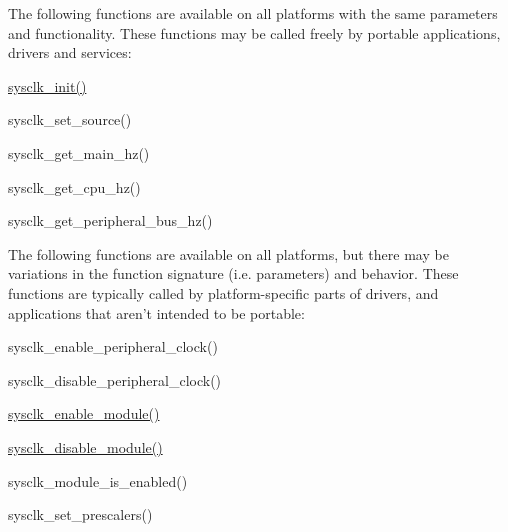 The following functions are available on all platforms with the same parameters and functionality. These functions may be called freely by portable applications, drivers and services\-:
\begin{DoxyItemize}
\item \hyperlink{group__sysclk__group_ga242399e48a97739c88b4d0c00f6101de}{sysclk\-\_\-init()}
\item sysclk\-\_\-set\-\_\-source()
\item sysclk\-\_\-get\-\_\-main\-\_\-hz()
\item sysclk\-\_\-get\-\_\-cpu\-\_\-hz()
\item sysclk\-\_\-get\-\_\-peripheral\-\_\-bus\-\_\-hz()
\end{DoxyItemize}

The following functions are available on all platforms, but there may be variations in the function signature (i.\-e. parameters) and behavior. These functions are typically called by platform-\/specific parts of drivers, and applications that aren't intended to be portable\-:
\begin{DoxyItemize}
\item sysclk\-\_\-enable\-\_\-peripheral\-\_\-clock()
\item sysclk\-\_\-disable\-\_\-peripheral\-\_\-clock()
\item \hyperlink{group__sysclk__group_gac31edbbb1296f1eb737401b7b2b4e352}{sysclk\-\_\-enable\-\_\-module()}
\item \hyperlink{group__sysclk__group_gaa2610ab0fbb9f2d68c7415c7c15b7008}{sysclk\-\_\-disable\-\_\-module()}
\item sysclk\-\_\-module\-\_\-is\-\_\-enabled()
\item sysclk\-\_\-set\-\_\-prescalers()
\end{DoxyItemize}

